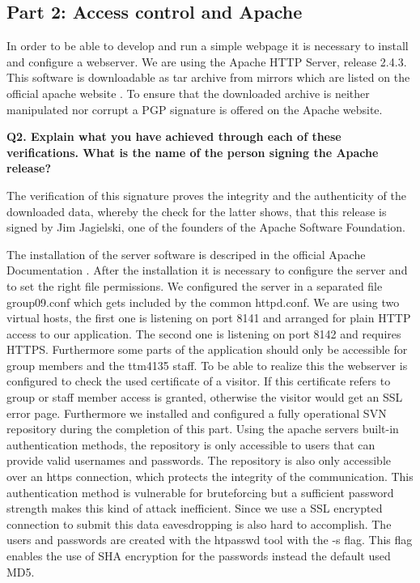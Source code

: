 \subsection {Part 2: Access control and Apache}


\noindent
In order to be able to develop and run a simple webpage it is necessary to install and configure a webserver. 
We are using  the Apache HTTP Server, release 2.4.3. This software is downloadable as tar archive from mirrors 
which are listed on the official apache website \cite{quelle1}. To ensure that the downloaded archive is neither manipulated 
nor corrupt a PGP signature is offered on the Apache website. 
\newline

\noindent
{\bf Q2. Explain what you have achieved through each of these verifications.
What is the name of the person signing the Apache release?}
\newline

\noindent
The verification of this signature proves the integrity and the authenticity of the downloaded data, 
whereby the check for the latter shows, that this release is signed by Jim Jagielski, 
one of the founders of the Apache Software Foundation. 
\newline

\noindent
The installation of the server software is descriped in the official Apache Documentation \cite{quelle2}.
After the installation it is necessary to configure the server and to set the right file permissions. 
We configured the server in a separated file group09.conf which gets included by the common httpd.conf. 
We are using two virtual hosts, the first one is listening on port 8141 and arranged for plain HTTP access to our application.
The second one is listening on port 8142 and requires HTTPS. 
Furthermore some parts of the application should only be accessible for group members and the ttm4135 staff. To be able to realize this 
the webserver is configured to check the used certificate of a visitor. 
If this certificate refers to group or staff member access is granted, 
otherwise the visitor would get an SSL error page. 
\newline
\noindent
Furthermore we installed and configured a fully operational SVN repository during the completion of this part.
Using the apache servers built-in authentication methods, the repository is only accessible to users that can provide valid usernames and passwords. The repository is also only accessible over an https connection, which protects the integrity of the communication. This authentication method is vulnerable for bruteforcing but a sufficient password strength makes this kind of attack inefficient. Since we use a SSL encrypted connection to submit this data eavesdropping is also hard to accomplish. The users and passwords are created with the htpasswd tool with the -s flag. This flag enables the use of SHA encryption for the passwords instead the default used MD5.
\newline

